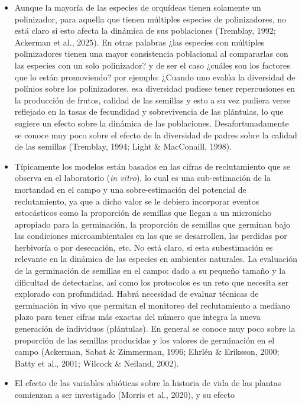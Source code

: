 \documentclass[
  12pt,
  letterpaper,
]{book}
\begin{document}
\begin{itemize}
\item
  Aunque la mayoría de las especies de orquídeas tienen solamente un
  polinizador, para aquella que tienen múltiples especies de
  polinizadores, no está claro si esto afecta la dinámica de sus
  poblaciones (Tremblay, 1992; Ackerman et al., 2025). En otras palabras
  ¿las especies con múltiples polinizadores tienen una mayor
  consistencia poblacional al compararlas con las especies con un solo
  polinizador? y de ser el caso ¿cuáles son los factores que lo están
  promoviendo? por ejemplo: ¿Cuando uno evalúa la diversidad de polínios
  sobre los polinizadores, esa diversidad pudiese tener repercusiones en
  la producción de frutos, calidad de las semillas y esto a su vez
  pudiera verse reflejado en la tasas de fecundidad y sobrevivencia de
  las plántulas, lo que sugiere un efecto sobre la dinámica de las
  poblaciones. Desafortunadamente se conoce muy poco sobre el efecto de
  la diversidad de padres sobre la calidad de las semillas (Tremblay,
  1994; Light \& MacConaill, 1998).
\item
  Típicamente los modelos están basados en las cifras de reclutamiento
  que se observa en el laboratorio (\emph{in vitro}), lo cual es una
  sub-estimación de la mortandad en el campo y una sobre-estimación del
  potencial de reclutamiento, ya que a dicho valor se le debiera
  incorporar eventos estocásticos como la proporción de semillas que
  llegan a un micronicho apropiado para la germinación, la proporción de
  semillas que germinan bajo las condiciones microambientales en las que
  se desarrollen, las perdidas por herbivoría o por desecación, etc. No
  está claro, si esta subestimación es relevante en la dinámica de las
  especies en ambientes naturales. La evaluación de la germinación de
  semillas en el campo: dado a su pequeño tamaño y la dificultad de
  detectarlas, así como los protocolos es un reto que necesita ser
  explorado con profundidad. Habrá necesidad de evaluar técnicas de
  germinación in vivo que permitan el monitoreo del reclutamiento a
  mediano plazo para tener cifras más exactas del número que integra la
  nueva generación de individuos (plántulas). En general se conoce muy
  poco sobre la proporción de las semillas producidas y los valores de
  germinación en el campo (Ackerman, Sabat \& Zimmerman, 1996; Ehrlén \&
  Eriksson, 2000; Batty et al., 2001; Wilcock \& Neiland, 2002).
\item
  El efecto de las variables abióticas sobre la historia de vida de las
  plantas comienzan a ser investigado (Morris et al., 2020), y su efecto

\end{itemize}
\end{document}
